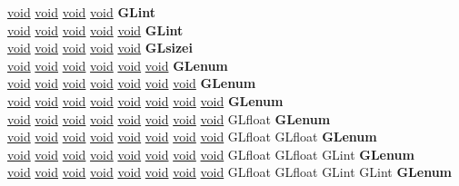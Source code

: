\begin{DoxyCompactItemize}
\begin{tabbing}
\>\hyperlink{interfacevoid}{void} \hyperlink{interfacevoid}{void} \hyperlink{interfacevoid}{void} \hyperlink{interfacevoid}{void} {\bfseries GLint}\\
\>\hyperlink{interfacevoid}{void} \hyperlink{interfacevoid}{void} \hyperlink{interfacevoid}{void} \hyperlink{interfacevoid}{void} \hyperlink{interfacevoid}{void} {\bfseries GLint}\\
\>\hyperlink{interfacevoid}{void} \hyperlink{interfacevoid}{void} \hyperlink{interfacevoid}{void} \hyperlink{interfacevoid}{void} \hyperlink{interfacevoid}{void} {\bfseries GLsizei}\\
\>\hyperlink{interfacevoid}{void} \hyperlink{interfacevoid}{void} \hyperlink{interfacevoid}{void} \hyperlink{interfacevoid}{void} \hyperlink{interfacevoid}{void} \hyperlink{interfacevoid}{void} {\bfseries GLenum}\\
\>\hyperlink{interfacevoid}{void} \hyperlink{interfacevoid}{void} \hyperlink{interfacevoid}{void} \hyperlink{interfacevoid}{void} \hyperlink{interfacevoid}{void} \hyperlink{interfacevoid}{void} \hyperlink{interfacevoid}{void} {\bfseries GLenum}\\
\>\hyperlink{interfacevoid}{void} \hyperlink{interfacevoid}{void} \hyperlink{interfacevoid}{void} \hyperlink{interfacevoid}{void} \hyperlink{interfacevoid}{void} \hyperlink{interfacevoid}{void} \hyperlink{interfacevoid}{void} \hyperlink{interfacevoid}{void} {\bfseries GLenum}\\
\>\hyperlink{interfacevoid}{void} \hyperlink{interfacevoid}{void} \hyperlink{interfacevoid}{void} \hyperlink{interfacevoid}{void} \hyperlink{interfacevoid}{void} \hyperlink{interfacevoid}{void} \hyperlink{interfacevoid}{void} \hyperlink{interfacevoid}{void} GLfloat {\bfseries GLenum}\\
\>\hyperlink{interfacevoid}{void} \hyperlink{interfacevoid}{void} \hyperlink{interfacevoid}{void} \hyperlink{interfacevoid}{void} \hyperlink{interfacevoid}{void} \hyperlink{interfacevoid}{void} \hyperlink{interfacevoid}{void} \hyperlink{interfacevoid}{void} GLfloat GLfloat {\bfseries GLenum}\\
\>\hyperlink{interfacevoid}{void} \hyperlink{interfacevoid}{void} \hyperlink{interfacevoid}{void} \hyperlink{interfacevoid}{void} \hyperlink{interfacevoid}{void} \hyperlink{interfacevoid}{void} \hyperlink{interfacevoid}{void} \hyperlink{interfacevoid}{void} GLfloat GLfloat GLint {\bfseries GLenum}\\
\>\hyperlink{interfacevoid}{void} \hyperlink{interfacevoid}{void} \hyperlink{interfacevoid}{void} \hyperlink{interfacevoid}{void} \hyperlink{interfacevoid}{void} \hyperlink{interfacevoid}{void} \hyperlink{interfacevoid}{void} \hyperlink{interfacevoid}{void} GLfloat GLfloat GLint GLint {\bfseries GLenum}\\

\end{tabbing}
\end{DoxyCompactItemize}
